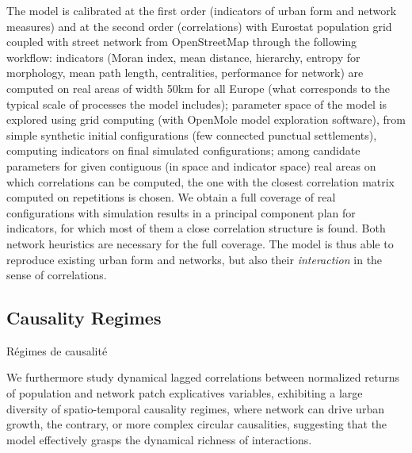 The model is calibrated at the first order (indicators of urban form and network measures) and at the second order (correlations) with Eurostat population grid coupled with street network from OpenStreetMap through the following workflow: indicators (Moran index, mean distance, hierarchy, entropy for morphology, mean path length, centralities, performance for network) are computed on real areas of width 50km for all Europe (what corresponds to the typical scale of processes the model includes); parameter space of the model is explored using grid computing (with OpenMole model exploration software), from simple synthetic initial configurations (few connected punctual settlements), computing indicators on final simulated configurations; among candidate parameters for given contiguous (in space and indicator space) real areas on which correlations can be computed, the one with the closest correlation matrix computed on repetitions is chosen. We obtain a full coverage of real configurations with simulation results in a principal component plan for indicators, for which most of them a close correlation structure is found. Both network heuristics are necessary for the full coverage. The model is thus able to reproduce existing urban form and networks, but also their \emph{interaction} in the sense of correlations.

















\subsection{Causality Regimes}{Régimes de causalité}





We furthermore study dynamical lagged correlations between normalized returns of population and network patch explicatives variables, exhibiting a large diversity of spatio-temporal causality regimes, where network can drive urban growth, the contrary, or more complex circular causalities, suggesting that the model effectively grasps the dynamical richness of interactions.











